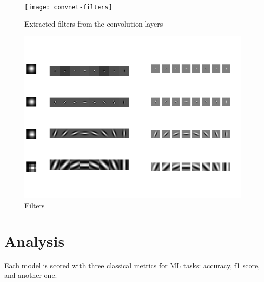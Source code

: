 \documentclass[11pt,a4paper]{article}
\begin{document}

\begin{figure}
    \label{fig:convnet:filters}
    \caption{Extracted filters from the convolution layers}
    \texttt{[image: convnet-filters]}
\end{figure}

\begin{figure}
    \label{fig:scatnet:filters}
    \caption{Filters}
    \includegraphics{scatnet-filters}
\end{figure}

\section{Analysis}

Each model is scored with three classical metrics for ML tasks: accuracy, f1 score, and another one.

\printbibliography
\end{document}
